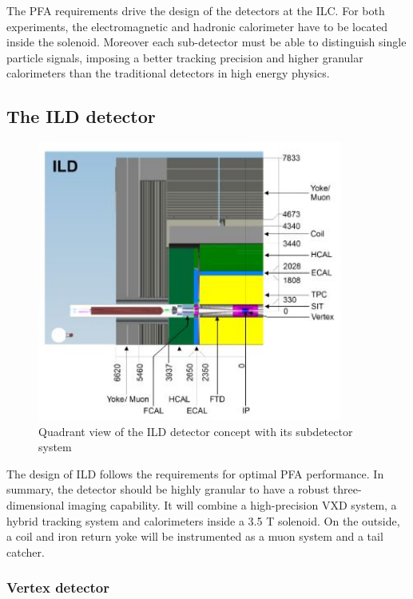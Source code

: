     The \gls{PFA} requirements drive the design of the detectors at the ILC.
    For both experiments, the electromagnetic and hadronic calorimeter have to be located inside the solenoid.
    Moreover each sub-detector must be able to distinguish single particle signals, imposing a better tracking precision and higher granular calorimeters than the traditional detectors in high energy physics.

    \subsection{The ILD detector}
    
    \begin{figure}[!h]
      \centering
      \includegraphics[width = 10cm]{Pictures/ILC/fig_ILD_Quadrant.png}
      \caption{Quadrant view of the ILD detector concept with its subdetector system}
      \label{fig:ILD}
    \end{figure}

    The design of \gls{ILD} follows the requirements for optimal \gls{PFA} performance.
    In summary, the detector should be highly granular to have a robust three-dimensional imaging capability.
    It will combine a high-precision \gls{VXD} system, a hybrid tracking system and calorimeters inside a 3.5 T solenoid. 
    On the outside, a coil and iron return yoke will be instrumented as a muon system and a tail catcher.

      \subsubsection{Vertex detector}

